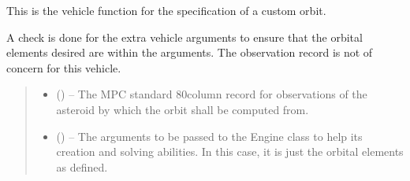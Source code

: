 \documentclass[letterpaper,11pt,english]{sphinxmanual}
\begin{document}
\begin{savenotes}\begin{fulllineitems}
\label{\detokenize{code/opihiexarata.orbit.solution:opihiexarata.orbit.solution._vehicle_custom_orbit}}
\pysigstartsignatures
{}
\pysigstopsignatures
\sphinxAtStartPar
This is the vehicle function for the specification of a custom orbit.

\sphinxAtStartPar
A check is done for the extra vehicle arguments to ensure that the orbital
elements desired are within the arguments. The observation record is
not of concern for this vehicle.
\begin{quote}\begin{description}
\begin{itemize}
\item {} 
\sphinxAtStartPar
{} () – The MPC standard 80\sphinxhyphen{}column record for observations of the asteroid
by which the orbit shall be computed from.

\item {} 
\sphinxAtStartPar
{} () – The arguments to be passed to the Engine class to help its creation
and solving abilities. In this case, it is just the orbital elements
as defined.

\end{itemize}

\end{description}\end{quote}

\end{fulllineitems}\end{savenotes}

\end{document}
